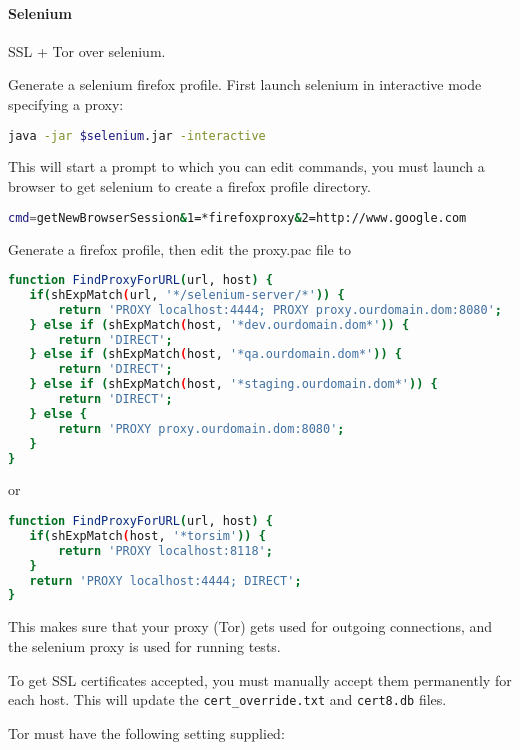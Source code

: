 \paragraph{Selenium}

SSL + Tor over selenium. 

Generate a selenium firefox profile. First launch selenium in interactive mode
specifying a proxy:

\begin{lstlisting}[language=sh]
java -jar $selenium.jar -interactive
\end{lstlisting}

This will start a prompt to which you can edit commands, you must launch a
browser to get selenium to create a firefox profile directory.

\begin{lstlisting}[language=sh]
cmd=getNewBrowserSession&1=*firefoxproxy&2=http://www.google.com
\end{lstlisting}

Generate a firefox profile, then edit the proxy.pac file to 

\begin{lstlisting}[language=sh]
function FindProxyForURL(url, host) {
   if(shExpMatch(url, '*/selenium-server/*')) {
       return 'PROXY localhost:4444; PROXY proxy.ourdomain.dom:8080';
   } else if (shExpMatch(host, '*dev.ourdomain.dom*')) {
       return 'DIRECT';
   } else if (shExpMatch(host, '*qa.ourdomain.dom*')) {
       return 'DIRECT';
   } else if (shExpMatch(host, '*staging.ourdomain.dom*')) {
       return 'DIRECT';
   } else {
       return 'PROXY proxy.ourdomain.dom:8080';
   }
}
\end{lstlisting}

or

\begin{lstlisting}[language=sh]
function FindProxyForURL(url, host) {
   if(shExpMatch(host, '*torsim')) {
       return 'PROXY localhost:8118';
   }
   return 'PROXY localhost:4444; DIRECT';
}
\end{lstlisting}

This makes sure that your proxy (Tor) gets used for outgoing connections, and
the selenium proxy is used for running tests.

To get SSL certificates accepted, you must manually accept them permanently for
each host. This will update the \verb+cert_override.txt+ and \verb+cert8.db+
files.

Tor must have the following setting supplied:

